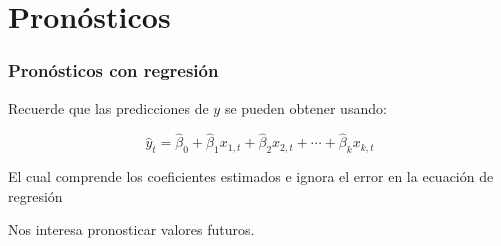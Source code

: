 \documentclass[10pt]{beamer}
\begin{document}








\section{Pronósticos}


\begin{frame}[fragile]
\frametitle{Pronósticos con regresión}

Recuerde que las predicciones de $y$ se pueden obtener usando:


\begin{block}{}
\[
  \hat{y}_t = \hat{\beta}_0 + \hat{\beta}_1 x_{1,t} + \hat{\beta}_2 x_{2,t} + \cdots + \hat{\beta}_kx_{k,t}
\]
\end{block}

\vspace{2mm}

El cual comprende los coeficientes estimados e ignora el error en la ecuación de regresión

\vspace{4mm}

Nos interesa pronosticar valores futuros.



\end{frame}







\end{document}
